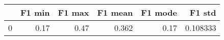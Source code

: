 \begin{tabular}{lrrrrr}
\toprule
{} &  F1 min &  F1 max &  F1 mean &  F1 mode &    F1 std \\
\midrule
0 &    0.17 &    0.47 &    0.362 &     0.17 &  0.108333 \\
\bottomrule
\end{tabular}
